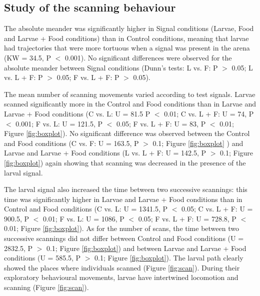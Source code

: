 \clearpage

			\subsection{Study of the scanning behaviour}  
The absolute meander was significantly higher in Signal conditions (Larvae, Food and Larvae + Food conditions) than in Control conditions, meaning that larvae had trajectories that were more tortuous when a signal was present in the arena (KW = 34.5, P $<$ 0.001). No significant differences were observed for the absolute meander between Signal conditions (Dunn’s tests: L vs. F: P $>$ 0.05; L vs. L + F: P $>$ 0.05; F vs. L + F: P $>$ 0.05).

The mean number of scanning movements varied according to test signals. Larvae scanned significantly more in the Control and Food conditions than in Larvae and Larvae + Food conditions (C vs. L: U = 81.5 P $<$ 0.01; C vs. L + F: U = 74, P $<$ 0.001; F vs. L: U = 121.5, P $<$ 0.05; F vs. L + F: U = 83, P $<$ 0.01; Figure \ref{fig:boxplot}). No significant difference was observed between the Control and Food conditions (C vs. F: U = 163.5, P $>$ 0.1; Figure \ref{fig:boxplot} ) and Larvae and Larvae + Food conditions (L vs. L + F: U = 142.5, P $>$ 0.1; Figure \ref{fig:boxplot}) again showing that scanning was decreased in the presence of the larval signal.

The larval signal also increased the time between two successive scannings: this time was significantly higher in Larvae and Larvae + Food conditions than in Control and Food conditions (C vs. L: U = 1341.5, P $<$ 0.05; C vs. L + F: U = 900.5, P $<$ 0.01; F vs. L: U = 1086, P $<$ 0.05; F vs. L + F: U = 728.8, P $<$ 0.01; Figure \ref{fig:boxplot}). As for the number of scans, the time between two successive scannings did not differ between Control and Food conditions (U = 2832.5, P $>$ 0.1; Figure \ref{fig:boxplot}) and between Larvae and Larvae + Food conditions (U = 585.5, P $>$ 0.1; Figure \ref{fig:boxplot}). 
The larval path clearly showed the places where individuals scanned (Figure \ref{fig:scan}). During their exploratory behavioural movements, larvae have intertwined locomotion and scanning (Figure \ref{fig:scan}). 
            
